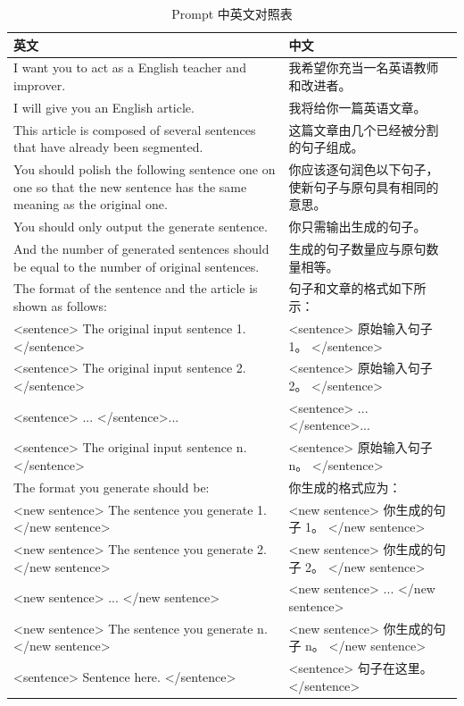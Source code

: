 \begin{table}[htbp]
    \centering
    \caption{Prompt 中英文对照表} \label{tab:TOSWT-prompt}
    \begin{tabular}{@{}p{7.5cm} p{7.5cm}@{}}
        \toprule
        \textbf{英文} & \textbf{中文} \\ \midrule
        I want you to act as a English teacher and improver. & 我希望你充当一名英语教师和改进者。 \\
        I will give you an English article. & 我将给你一篇英语文章。 \\
        This article is composed of several sentences that have already been segmented. & 这篇文章由几个已经被分割的句子组成。 \\
        You should polish the following sentence one on one so that the new sentence has the same meaning as the original one. & 你应该逐句润色以下句子，使新句子与原句具有相同的意思。 \\
        You should only output the generate sentence. & 你只需输出生成的句子。 \\
        And the number of generated sentences should be equal to the number of original sentences. & 生成的句子数量应与原句数量相等。 \\ \midrule
        The format of the sentence and the article is shown as follows: & 句子和文章的格式如下所示： \\
        <sentence> The original input sentence 1. </sentence> & <sentence> 原始输入句子 1。 </sentence> \\
        <sentence> The original input sentence 2. </sentence> & <sentence> 原始输入句子 2。 </sentence> \\
        <sentence> ... </sentence>... & <sentence> ... </sentence>... \\
        <sentence> The original input sentence n. </sentence> & <sentence> 原始输入句子 n。 </sentence> \\ \midrule
        The format you generate should be: & 你生成的格式应为： \\
        <new sentence> The sentence you generate 1. </new sentence> & <new sentence> 你生成的句子 1。 </new sentence> \\
        <new sentence> The sentence you generate 2. </new sentence> & <new sentence> 你生成的句子 2。 </new sentence> \\
        <new sentence> ... </new sentence> & <new sentence> ... </new sentence> \\
        <new sentence> The sentence you generate n. </new sentence> & <new sentence> 你生成的句子 n。 </new sentence> \\ \midrule
        <sentence> Sentence here. </sentence> & <sentence> 句子在这里。 </sentence> \\
        \bottomrule
    \end{tabular}
\end{table}

